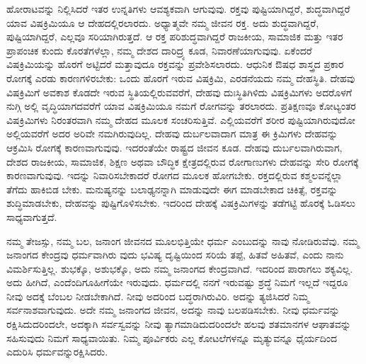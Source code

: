ಹೋರಾಟವನ್ನು ನಿಲ್ಲಿಸಿದರೆ ಇತರ ಉನ್ನತಿಗಳು ಆವಶ್ಯಕವಾಗಿ ಆಗುವುವು. ರಕ್ತವು ಪುಷ್ಟಿಯಾಗಿದ್ದರೆ, ಶುದ್ಧವಾಗಿದ್ದರೆ ಯಾವ ವಿಷಕ್ರಿಮಿಯೂ ಆ ದೇಹದಲ್ಲಿರಲಾರದು. ಅಧ್ಯಾತ್ಮವೇ ನಮ್ಮ ಜೀವನ ರಕ್ತ. ಅದು ಶುದ್ಧವಾಗಿದ್ದರೆ, ಪುಷ್ಟಿಯಾಗಿದ್ದರೆ, ಎಲ್ಲವೂ ಸರಿಯಾಗಿರುತ್ತದೆ. ಆ ರಕ್ತ ಪರಿಶುದ್ಧವಾಗಿದ್ದರೆ ರಾಜಕೀಯ, ಸಾಮಾಜಿಕ ಮತ್ತು ಇತರ ಪ್ರಾಪಂಚಿಕ ಕುಂದು ಕೊರತೆಗಳೆಲ್ಲಾ, ನಮ್ಮ ದೇಶದ ದಾರಿದ್ರ್ಯ ಕೂಡ, ನಿವಾರಣೆಯಾಗುವುವು. ಏಕೆಂದರೆ ವಿಷಕ್ರಿಮಿಯನ್ನು ಹೊರಗೆ ಅಟ್ಟಿದರೆ ಮತ್ತಾವುದೂ ರಕ್ತವನ್ನು ಪ್ರವೇಶಿಸಲಾರದು. ಆಧುನಿಕ ಔಷಧ ಶಾಸ್ತ್ರದ ಪ್ರಕಾರ ರೋಗಕ್ಕೆ ಎರಡು ಕಾರಣಗಳಿರಬೇಕು: ಒಂದು ಹೊರಗೆ ಇರುವ ವಿಷಕ್ರಿಮಿ, ಎರಡನೆಯದು ನಮ್ಮ ದೇಹಸ್ಥಿತಿ. ದೇಹವು ವಿಷಕ್ರಿಮಿಗೆ ಅವಕಾಶ ಕೊಡದೇ ಇರುವ ಸ್ಥಿತಿಯಲ್ಲಿರುವವರೆಗೆ, ದೇಹವು ದುಃಸ್ಥಿತಿಗಿಳಿದು ವಿಷಕ್ರಿಮಿಗಳು ಅದರೊಳಗೆ ನುಗ್ಗಿ ಅಲ್ಲಿ ವೃದ್ಧಿಯಾಗದವರೆಗೆ ಯಾವ ವಿಷಕ್ರಿಮಿಯೂ ನಮಗೆ ರೋಗವನ್ನು ತರಲಾರದು. ಪ್ರತಿಕ್ಷಣವೂ ಕೋಟ್ಯಂತರ ವಿಷಕ್ರಿಮಿಗಳು ನಿರಂತರವಾಗಿ ನಮ್ಮ ದೇಹದ ಮೂಲಕ ಸಂಚರಿಸುತ್ತಿವೆ. ಎಲ್ಲಿಯವರೆಗೆ ಶರೀರ ಪುಷ್ಟಿಯಾಗಿರುವುದೋ ಅಲ್ಲಿಯವರೆಗೆ ಅದರ ಅರಿವೇ ನಮಗಿರುವುದಿಲ್ಲ. ದೇಹವು ದುರ್ಬಲವಾದಾಗ ಮಾತ್ರ ಈ ಕ್ರಿಮಿಗಳು ದೇಹವನ್ನು ಆಕ್ರಮಿಸಿ ರೋಗಕ್ಕೆ ಕಾರಣವಾಗುವುವು. ಇದರಂತೆಯೇ ರಾಷ್ಟ್ರದ ಜೀವನ ಕೂಡ. ದೇಹವು ದುರ್ಬಲವಾಗಿರುವಾಗ, ದೇಶದ ರಾಜಕೀಯ, ಸಾಮಾಜಿಕ, ಶಿಕ್ಷಣ ಅಥವಾ ಬೌದ್ಧಿಕ ಕ್ಷೇತ್ರದಲ್ಲಿರುವ ರೋಗಾಣುಗಳು ದೇಹವನ್ನು ಸೇರಿ ರೋಗಕ್ಕೆ ಕಾರಣವಾಗುವುವು. ಇದನ್ನು ನಿವಾರಿಸಬೇಕಾದರೆ ರೋಗದ ಮೂಲಕ ಹೋಗಬೇಕು. ರಕ್ತದಲ್ಲಿರುವ ಕಶ್ಮಲವನ್ನೆಲ್ಲಾ ತೆಗೆದು ಹಾಕಿಬಿಡ ಬೇಕು. ಮನುಷ್ಯನನ್ನು ಬಲಾಢ್ಯನನ್ನಾಗಿ ಮಾಡುವುದೇ ಈಗ ಮಾಡಬೇಕಾದ ಚಿಕಿತ್ಸೆ, ರಕ್ತವನ್ನು ಶುದ್ಧಿಮಾಡಬೇಕು, ದೇಹವನ್ನು ಪುಷ್ಟಿಗೊಳಿಸಬೇಕು. ಇದರಿಂದ ದೇಹಕ್ಕೆ ವಿಷಕ್ರಿಮಿಗಳನ್ನು ತಡೆಗಟ್ಟಿ ಹೊರಕ್ಕೆ ಓಡಿಸಲು ಸಾಧ್ಯವಾಗುತ್ತದೆ. 

ನಮ್ಮ ತೇಜಸ್ಸು, ನಮ್ಮ ಬಲ, ಜನಾಂಗ ಜೀವನದ ಮೂಲಭಿತ್ತಿಯೇ ಧರ್ಮ ಎಂಬುದನ್ನು ನಾವು ನೋಡಿರುವೆವು. ನಮ್ಮ ಜನಾಂಗದ ಕೇಂದ್ರವು ಧರ್ಮವಾಗಿರು ವುದು ಭವಿಷ್ಯ ದೃಷ್ಟಿಯಿಂದ ಸರಿಯೆ ತಪ್ಪೆ, ಹಿತವೆ ಅಹಿತವೆ, ಎಂದು ನಾನು ವಿಮರ್ಶಿಸುತ್ತಿಲ್ಲ. ಶುಭಕ್ಕೊ, ಅಶುಭಕ್ಕೊ, ಅದು ನಮ್ಮ ಜನಾಂಗದ ಕೇಂದ್ರವಾಗಿದೆ. ಇದರಿಂದ ಪಾರಾಗಲು ಶಕ್ಯವಿಲ್ಲ. ಅದು ಹೀಗಿದೆ, ಎಂದೆಂದಿಗೂಹೀಗೆಯೇ ಇರುವುದು. ಧರ್ಮದಲ್ಲಿ ನನಗೆ ಇರುವಷ್ಟು ಶ್ರದ್ಧೆ ನಿಮಗೆ ಇಲ್ಲದೆ ಇದ್ದರೂ ನೀವು ಅದಕ್ಕೆ ಬೆಂಬಲ ನೀಡಬೇಕಾಗಿದೆ. ನೀವು ಅದರಿಂದ ಬದ್ಧರಾಗಿರುವಿರಿ. ಅದನ್ನು ತ್ಯಜಿಸಿದರೆ ನಿಮ್ಮ ಸರ್ವನಾಶವಾಗುವುದು. ಅದೇ ನಮ್ಮ ಜನಾಂಗದ ಜೀವನ, ಅದನ್ನು ನಾವು ಬಲಪಡಿಸಬೇಕು. ನೀವು ಧರ್ಮವನ್ನು ರಕ್ಷಿಸಿದುದರಿಂದಲೇ, ಅದಕ್ಕಾಗಿ ಸರ್ವಸ್ವವನ್ನು ನೀವು ತ್ಯಾಗಮಾಡಿದುದರಿಂದಲೇ ಹಲವು ಶತಮಾನಗಳ ಆಘಾತವನ್ನು ಸಹಿಸುವುದು ನಿಮಗೆ ಸಾಧ್ಯವಾಯಿತು. ನಿಮ್ಮ ಪೂರ್ವಿಕರು ಎಲ್ಲ ಕೋಟಲೆಗಳನ್ನೂ ಮೃತ್ಯುವನ್ನೂ ಧೈರ್ಯದಿಂದ ಎದುರಿಸಿ ಧರ್ಮವನ್ನುರಕ್ಷಿಸಿದರು. 

